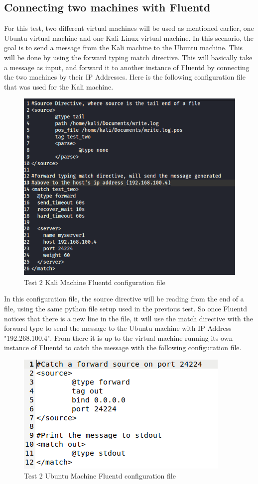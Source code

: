 \documentclass{article}
\begin{document}
\subsection{Connecting two machines with Fluentd}
\quad \quad For this test, two different virtual machines will be used as mentioned earlier, one Ubuntu virtual machine and one Kali Linux virtual machine. In this scenario, the goal is to send a message from the Kali machine to the Ubuntu machine. This will be done
by using the forward typing match directive. This will basically take a message as input, and forward it to another instance of Fluentd by connecting the two machines by their IP Addresses. Here is the following configuration file that was used for the Kali machine.
\begin{figure}[H]
    \centering
    \includegraphics[scale=0.75]{images/t2_1.png}
    \caption{Test 2 Kali Machine Fluentd configuration file}
    \label{fig:pic7}
\end{figure}
In this configuration file, the source directive will be reading from the end of a file, using the same python file setup used in the previous test. So once Fluentd notices that there is a new line in the file, it will
use the match directive with the forward type to send the message to the Ubuntu machine with IP Address "192.268.100.4". From there it is up to the virtual machine running its own instance of Fluentd to catch the message with the following configuration file.
\begin{figure}[H]
    \centering
    \includegraphics[scale=1]{images/t2_2.png}
    \caption{Test 2 Ubuntu Machine Fluentd configuration file}
    \label{fig:pic8}
\end{figure}
\end{document}
